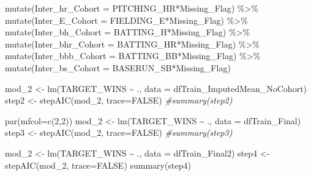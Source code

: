 \documentclass[
]{article}
\newenvironment{Shaded}{\begin{snugshade}}{\end{snugshade}}
\newcommand{\AttributeTok}[1]{\textcolor[rgb]{0.77,0.63,0.00}{#1}}
\newcommand{\CommentTok}[1]{\textcolor[rgb]{0.56,0.35,0.01}{\textit{#1}}}
\newcommand{\ConstantTok}[1]{\textcolor[rgb]{0.00,0.00,0.00}{#1}}
\newcommand{\DecValTok}[1]{\textcolor[rgb]{0.00,0.00,0.81}{#1}}
\newcommand{\FunctionTok}[1]{\textcolor[rgb]{0.00,0.00,0.00}{#1}}
\newcommand{\NormalTok}[1]{#1}
\newcommand{\OtherTok}[1]{\textcolor[rgb]{0.56,0.35,0.01}{#1}}
\newcommand{\SpecialCharTok}[1]{\textcolor[rgb]{0.00,0.00,0.00}{#1}}
\begin{document}
\begin{Shaded}
\begin{Highlighting}[]
  \FunctionTok{mutate}\NormalTok{(}\AttributeTok{Inter\_hr\_Cohort =}\NormalTok{ PITCHING\_HR}\SpecialCharTok{*}\NormalTok{Missing\_Flag) }\SpecialCharTok{\%\textgreater{}\%}
  \FunctionTok{mutate}\NormalTok{(}\AttributeTok{Inter\_E\_Cohort =}\NormalTok{ FIELDING\_E}\SpecialCharTok{*}\NormalTok{Missing\_Flag) }\SpecialCharTok{\%\textgreater{}\%}
  \FunctionTok{mutate}\NormalTok{(}\AttributeTok{Inter\_bh\_Cohort =}\NormalTok{ BATTING\_H}\SpecialCharTok{*}\NormalTok{Missing\_Flag) }\SpecialCharTok{\%\textgreater{}\%}
  \FunctionTok{mutate}\NormalTok{(}\AttributeTok{Inter\_bhr\_Cohort =}\NormalTok{ BATTING\_HR}\SpecialCharTok{*}\NormalTok{Missing\_Flag) }\SpecialCharTok{\%\textgreater{}\%}
  \FunctionTok{mutate}\NormalTok{(}\AttributeTok{Inter\_bbb\_Cohort =}\NormalTok{ BATTING\_BB}\SpecialCharTok{*}\NormalTok{Missing\_Flag) }\SpecialCharTok{\%\textgreater{}\%}
  \FunctionTok{mutate}\NormalTok{(}\AttributeTok{Inter\_bs\_Cohort =}\NormalTok{ BASERUN\_SB}\SpecialCharTok{*}\NormalTok{Missing\_Flag) }

\NormalTok{mod\_2 }\OtherTok{\textless{}{-}} \FunctionTok{lm}\NormalTok{(TARGET\_WINS }\SpecialCharTok{\textasciitilde{}}\NormalTok{ ., }\AttributeTok{data =}\NormalTok{ dfTrain\_ImputedMean\_NoCohort)}
\NormalTok{step2 }\OtherTok{\textless{}{-}} \FunctionTok{stepAIC}\NormalTok{(mod\_2, }\AttributeTok{trace=}\ConstantTok{FALSE}\NormalTok{)}
\CommentTok{\#summary(step2)}

\FunctionTok{par}\NormalTok{(}\AttributeTok{mfcol=}\FunctionTok{c}\NormalTok{(}\DecValTok{2}\NormalTok{,}\DecValTok{2}\NormalTok{))}
\NormalTok{mod\_2 }\OtherTok{\textless{}{-}} \FunctionTok{lm}\NormalTok{(TARGET\_WINS }\SpecialCharTok{\textasciitilde{}}\NormalTok{ ., }\AttributeTok{data =}\NormalTok{ dfTrain\_Final)}
\NormalTok{step3 }\OtherTok{\textless{}{-}} \FunctionTok{stepAIC}\NormalTok{(mod\_2, }\AttributeTok{trace=}\ConstantTok{FALSE}\NormalTok{)}
\CommentTok{\#summary(step3)}

\NormalTok{mod\_2 }\OtherTok{\textless{}{-}} \FunctionTok{lm}\NormalTok{(TARGET\_WINS }\SpecialCharTok{\textasciitilde{}}\NormalTok{ ., }\AttributeTok{data =}\NormalTok{ dfTrain\_Final2)}
\NormalTok{step4 }\OtherTok{\textless{}{-}} \FunctionTok{stepAIC}\NormalTok{(mod\_2, }\AttributeTok{trace=}\ConstantTok{FALSE}\NormalTok{)}
\FunctionTok{summary}\NormalTok{(step4)}
\end{Highlighting}
\end{Shaded}
\end{document}
